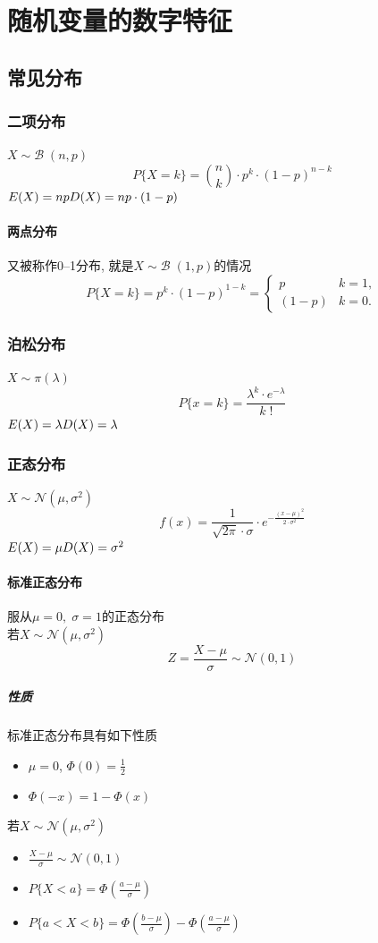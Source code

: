 \documentclass[a4paper]{report}
\begin{document}
\chapter{随机变量的数字特征}
\section{常见分布}
\subsection{二项分布}
$X\sim\mathcal{B}\;(n,p)$
$$P \{X=k\}=\binom{n}{k}\cdot p^{k}\cdot (1-p)^{n-k}$$
$E(X)=np\\D(X)=n p\cdot (1-p)$
\subsubsection{两点分布}
又被称作0--1分布, 就是$X\sim \mathcal{B}\;(1,p)$的情况
$$P \{X=k\}=p^k\cdot (1-p)^{1-k}=
\begin{cases}
  p&k=1,\\
  (1-p)&k=0.
\end{cases}$$
\subsection{泊松分布}
$X\sim \pi(\lambda)$
$$P\{x=k\}=\frac{\lambda^k \cdot e^{-\lambda}}{k\;!}$$
$E(X)=\lambda \\ D(X)=\lambda$
\subsection{正态分布}
$X\sim \mathcal{N}(\mu,\sigma^2)$
$$f(x)=\frac{1}{\sqrt{2\pi}\cdot \sigma}\cdot e^{-\frac{(x-\mu)^2}{2\cdot\sigma^2}}$$
$E(X)=\mu \\ D(X)=\sigma^2$
\subsubsection{标准正态分布}
服从$\mu=0,\;\sigma=1$的正态分布\\
若$X\sim \mathcal{N}(\mu,\sigma^2)$
$$Z=\frac{X-\mu}{\sigma}\sim \mathcal{N}(0,1)$$
\paragraph{性质}标准正态分布具有如下性质
\begin{itemize}
  \item $\mu=0$, $\Phi(0)=\frac{1}{2}$
  \item $\Phi(-x)=1-\Phi(x)$
\end{itemize}
若$X\sim \mathcal{N}(\mu,\sigma^2)$
\begin{itemize}
  \item $\frac{X-\mu}{\sigma}\sim \mathcal{N}(0,1)$
  \item $P \{X<a\}=\Phi(\frac{a-\mu}{\sigma})$
  \item $P \{a<X<b\}=\Phi(\frac{b-\mu}{\sigma})-\Phi(\frac{a-\mu}{\sigma})$
\end{itemize}
\end{document}
